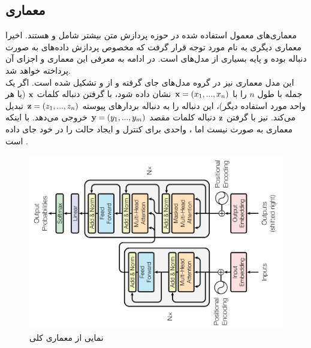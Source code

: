 \subsection{معماری \transformer{}}
معماری‌های معمول استفاده شده در حوزه پردازش متن بیشتر شامل \lstm{} و \cnn{} هستند. اخیرا معماری دیگری به نام \transformer{} مورد توجه قرار گرفت که مخصوص پردازش داده‌های به صورت دنباله بوده و پایه بسیاری از مدل‌های \stateoftheart{} است. در ادامه به معرفی این معماری و اجزای آن پرداخته خواهد شد.
\\
این مدل معماری نیز در گروه مدل‌های
جای گرفته و از \encoder{} و \decoder{} تشکیل شده است. اگر یک جمله با طول $n$ را با ${\bf x} = (x_1, ..., x_n)$  نشان داده شود، \encoder{} با گرفتن دنباله کلمات ${\bf x}$ (یا هر واحد مورد استفاده دیگر)، این دنباله  را به دنباله بردار‌های پیوسته ${\bf z} = (z_1, ..., z_n)$ تبدیل می‌کند. \decoder{} نیز با گرفتن ${\bf z}$ دنباله کلمات مقصد ${\bf y} = (y_1, ..., y_m)$ خروجی می‌دهد. با اینکه معماری \encoder{} به صورت \autoregressive{} نیست اما \decoder{}، واحدی برای کنترل و ایجاد حالت \autoregressive{} را در خود جای داده است \cite{transformer}.
\begin{figure}[H]
	\centering
	\includegraphics[width=.7\textwidth, angle=-90]{images/attention3.png}
	\caption{
        نمایی از معماری کلی \transformer{} \cite{transformer}}
\end{figure}

